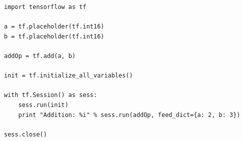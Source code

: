 \lstset{language=Python}
\begin{lstlisting}
import tensorflow as tf

a = tf.placeholder(tf.int16)
b = tf.placeholder(tf.int16)

addOp = tf.add(a, b)

init = tf.initialize_all_variables()

with tf.Session() as sess:
    sess.run(init)
    print "Addition: %i" % sess.run(addOp, feed_dict={a: 2, b: 3})

sess.close()
\end{lstlisting}